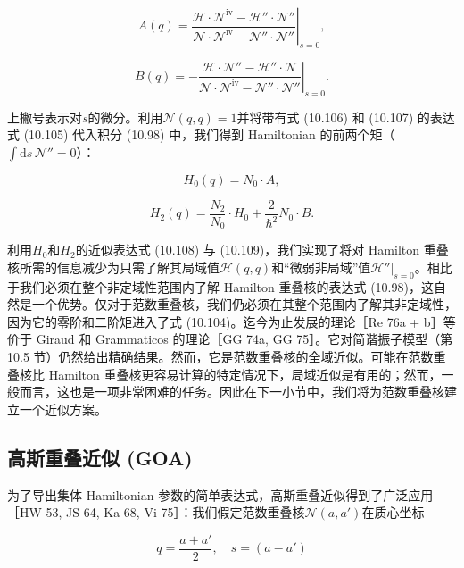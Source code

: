 \begin{equation}
A(q)=\left.\frac{\mathscr{H}\cdot\mathscr{N}^{\mathrm{iv}}-\mathscr{H}''\cdot\mathscr{N}''}{\mathscr{N}\cdot\mathscr{N}^{\mathrm{iv}}-\mathscr{N}''\cdot\mathscr{N}''}\right|_{s=0},\label{eq:10.106}
\end{equation}

\begin{equation}
B(q)=-\left.\frac{\mathscr{H}\cdot\mathscr{N}''-\mathscr{H}''\cdot\mathscr{N}}{\mathscr{N}\cdot\mathscr{N}^{\mathrm{iv}}-\mathscr{N}''\cdot\mathscr{N}''}\right|_{s=0}.\label{eq:10.107}
\end{equation}

上撇号表示对$s$的微分。利用$\mathscr{N}(q,q)=1$并将带有式 (10.106) 和 (10.107) 的表达式
(10.105) 代入积分 (10.98) 中，我们得到 Hamiltonian 的前两个矩（$\int\mathrm{d}s\,\mathscr{N}''=0$）：

\begin{equation}
H_{0}(q)=N_{0}\cdot A,\label{eq:10.108}
\end{equation}

\begin{equation}
H_{2}(q)=\frac{N_{2}}{N_{0}}\cdot H_{0}+\frac{2}{\hbar^{2}}N_{0}\cdot B.\label{eq:10.109}
\end{equation}

利用$H_{0}$和$H_{2}$的近似表达式 (10.108) 与 (10.109)，我们实现了将对 Hamilton 重叠核所需的信息减少为只需了解其局域值$\mathscr{H}(q,q)$和“微弱非局域”值$\mathscr{H}''|_{s=0}$。相比于我们必须在整个非定域性范围内了解
Hamilton 重叠核的表达式 (10.98)，这自然是一个优势。仅对于范数重叠核，我们仍必须在其整个范围内了解其非定域性，因为它的零阶和二阶矩进入了式
(10.104)。迄今为止发展的理论［Re 76a + b］等价于 Giraud 和 Grammaticos 的理论［GG 74a,
GG 75］。它对简谐振子模型（第 10.5 节）仍然给出精确结果。然而，它是范数重叠核的全域近似。可能在范数重叠核比 Hamilton
重叠核更容易计算的特定情况下，局域近似是有用的；然而，一般而言，这也是一项非常困难的任务。因此在下一小节中，我们将为范数重叠核建立一个近似方案。

\subsection{高斯重叠近似 (GOA)}

为了导出集体 Hamiltonian 参数的简单表达式，高斯重叠近似得到了广泛应用［HW 53, JS 64, Ka 68, Vi
75］：我们假定范数重叠核$\mathscr{N}(a,a')$在质心坐标

\begin{equation}
q=\frac{a+a'}{2},\quad s=(a-a')\label{eq:10.110}
\end{equation}

